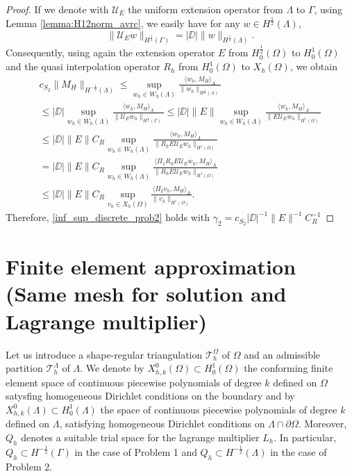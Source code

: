 \begin{proof}
If we denote with $\mathcal{U}_E$ the uniform extension operator from $\Lambda$ to $\Gamma$, using Lemma \ref{lemma:H12norm_avrc}, we easily have for any $w \in H^{\frac 12}(\Lambda)$,
\begin{equation*}
\|\mathcal{U}_E w\|_{H^{\frac 12}(\Gamma)}=|\DD| \|w\|_{H^{\frac 12}(\Lambda)}.
\end{equation*}
Consequently, using again the extension operator $E$ from $H^{\frac 12}_0(\Omega)$ to $H^1_0(\Omega)$ and the quasi interpolation operator $R_h$ from $H^1_0(\Omega)$ to $X_h(\Omega)$, we obtain
\begin{multline}
c_{S_2} \|M_H\|_{H^{-\frac 12}(\Lambda)} \leq 
\sup_{w_h \in W_h(\Lambda)} \frac{ \langle w_h, M_H \rangle_{\Lambda} } {\|w_h\|_{H^{\frac 12}(\Lambda)}} 
\\
\leq |\DD| \sup_{w_h \in W_h(\Lambda)} \frac{ \langle w_h, M_H \rangle _{\Lambda}} {\|\mathcal{U}_E w_h\|_{H^{\frac 12}(\Gamma)}} 
\leq |\DD| \|E\| \sup_{w_h \in W_h(\Lambda)} \frac{ \langle w_h, M_H \rangle _{\Lambda} } {\|E \mathcal{U}_E w_h\|_{H^1(\Omega)}} 
\\
\leq |\DD|\|E\| C_R \sup_{w_h \in W_h(\Lambda)} \frac{ \langle w_h, M_H \rangle _{\Lambda} } {\|R_h E \mathcal{U}_E w_h\|_{H^1(\Omega)}}
\\ 
=  |\DD| \|E\| C_R \sup_{w_h \in W_h(\Lambda)} \frac{ \langle \Pi _1  R_h E \mathcal{U}_E w_h, M_H \rangle _{\Lambda}} {\|R_h E \mathcal{U}_E w_h\|_{H^1(\Omega)}}
\\
\leq |\DD| \|E\| C_R \sup_{v_h \in X_h(\Omega)} \frac{ \langle \Pi _2  v_h, M_H \rangle _{\Lambda}} {\|v_h\|_{H^1(\Omega)}}. 
\end{multline}
Therefore, \eqref{inf_sup_discrete_prob2} holds with $\gamma_2=  c_{S_2} |\DD|^{-1} \|E\|^{-1} C_R^{-1}$
\end{proof}

\section{Finite element approximation (Same mesh for solution and Lagrange multiplier)}
Let us introduce a shape-regular triangulation $\mathcal{T}^{\Omega}_h$ of $\Omega$ and an admissible partition $\mathcal{T}^{\Lambda}_{h}$ of $\Lambda$. We denote by $X_{h,k}^0(\Omega)\subset H^1_0(\Omega)$ the conforming finite element space of continuous piecewise polynomials of degree $k$ defined on $\Omega$ satysfing homogeneous Dirichlet conditions on the boundary and by $X_{h,k}^0(\Lambda)\subset H^1_0(\Lambda)$ the space of continuous piecewise polynomials of degree $k$ defined on $\Lambda$, satisfying homogeneous Dirichlet conditions on $\Lambda \cap \partial \Omega$. Moreover, $Q_{h}$ denotes a suitable trial space for the lagrange multiplier $L_h$. In particular, $Q_h \subset H^{-\frac12}(\Gamma )$ in the case of Problem 1 and $Q_h \subset H^{-\frac12}(\Lambda)$ in the case of Problem 2.
 
